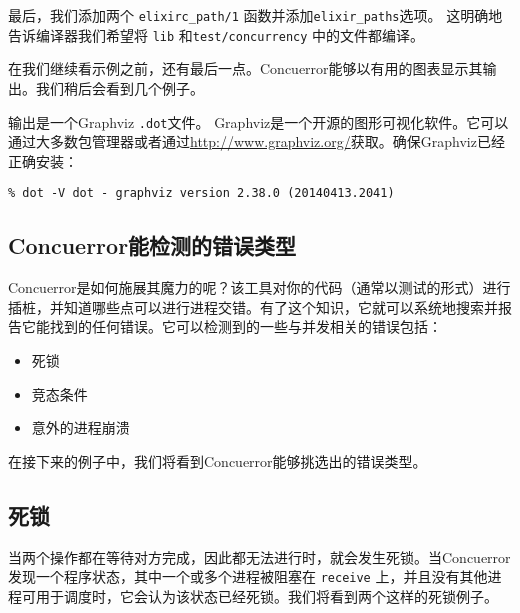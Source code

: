 最后，我们添加两个 \texttt{elixirc\_path/1} 函数并添加\texttt{elixir\_paths}选项。
这明确地告诉编译器我们希望将 \texttt{lib} 和\texttt{test/concurrency} 中的文件都编译。

在我们继续看示例之前，还有最后一点。Concuerror能够以有用的图表显示其输出。我们稍后会看到几个例子。

输出是一个Graphviz \texttt{.dot}文件。
Graphviz是一个开源的图形可视化软件。它可以通过大多数包管理器或者通过\url{http://www.graphviz.org/}获取。确保Graphviz已经正确安装：

\begin{code}{}
\begin{verbatim}
% dot -V dot - graphviz version 2.38.0 (20140413.2041)
\end{verbatim}
\end{code}

\subsection{Concuerror能检测的错误类型}

Concuerror是如何施展其魔力的呢？该工具对你的代码（通常以测试的形式）进行插桩，并知道哪些点可以进行进程交错。有了这个知识，它就可以系统地搜索并报告它能找到的任何错误。它可以检测到的一些与并发相关的错误包括：

\begin{itemize}

\item  死锁
\item  竞态条件
\item  意外的进程崩溃
\end{itemize}

在接下来的例子中，我们将看到Concuerror能够挑选出的错误类型。

\subsection{死锁}

当两个操作都在等待对方完成，因此都无法进行时，就会发生死锁。当Concuerror发现一个程序状态，其中一个或多个进程被阻塞在
\texttt{receive}
上，并且没有其他进程可用于调度时，它会认为该状态已经死锁。我们将看到两个这样的死锁例子。

